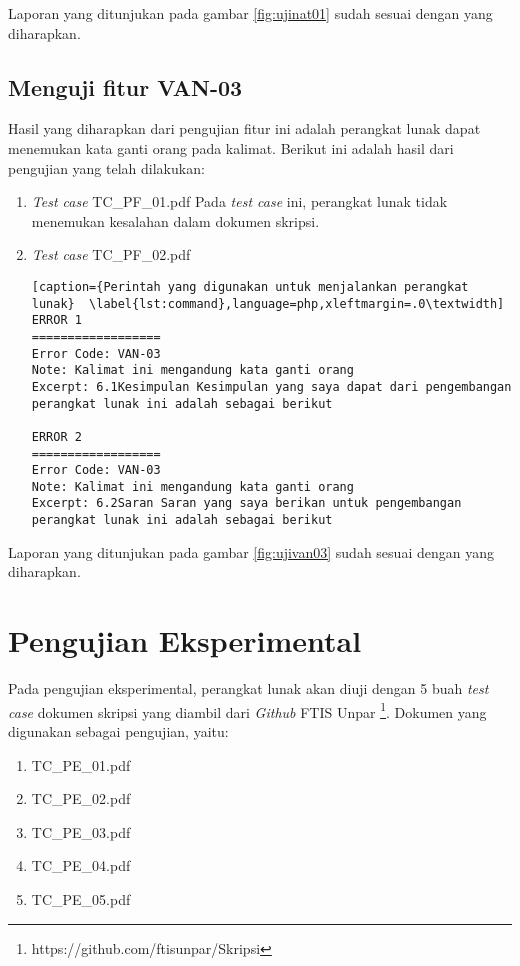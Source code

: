 Laporan yang ditunjukan pada gambar \ref{fig:ujinat01} sudah sesuai dengan yang diharapkan.

\subsection{Menguji fitur VAN-03}
Hasil yang diharapkan dari pengujian fitur ini adalah perangkat lunak dapat menemukan kata ganti orang pada kalimat. Berikut ini adalah hasil dari pengujian yang telah dilakukan:

\begin{enumerate}
	\item \textit{Test case} TC\_PF\_01.pdf
	Pada \textit{test case} ini, perangkat lunak tidak menemukan kesalahan dalam dokumen skripsi.
	
	\item \textit{Test case} TC\_PF\_02.pdf
	
\begin{lstlisting}[caption={Perintah yang digunakan untuk menjalankan perangkat lunak}	\label{lst:command},language=php,xleftmargin=.0\textwidth]
ERROR 1
==================
Error Code: VAN-03
Note: Kalimat ini mengandung kata ganti orang
Excerpt: 6.1Kesimpulan Kesimpulan yang saya dapat dari pengembangan perangkat lunak ini adalah sebagai berikut

ERROR 2
==================
Error Code: VAN-03
Note: Kalimat ini mengandung kata ganti orang
Excerpt: 6.2Saran Saran yang saya berikan untuk pengembangan perangkat lunak ini adalah sebagai berikut
\end{lstlisting}
\end{enumerate}

Laporan yang ditunjukan pada gambar \ref{fig:ujivan03} sudah sesuai dengan yang diharapkan.

\section{Pengujian Eksperimental}
Pada pengujian eksperimental, perangkat lunak akan diuji dengan 5 buah \textit{test case} dokumen skripsi yang diambil dari \textit{Github} FTIS Unpar \footnote{https://github.com/ftisunpar/Skripsi}. Dokumen yang digunakan sebagai pengujian, yaitu:

\begin{enumerate}
	\item TC\_PE\_01.pdf
	\item TC\_PE\_02.pdf
	\item TC\_PE\_03.pdf
	\item TC\_PE\_04.pdf
	\item TC\_PE\_05.pdf 
\end{enumerate}

